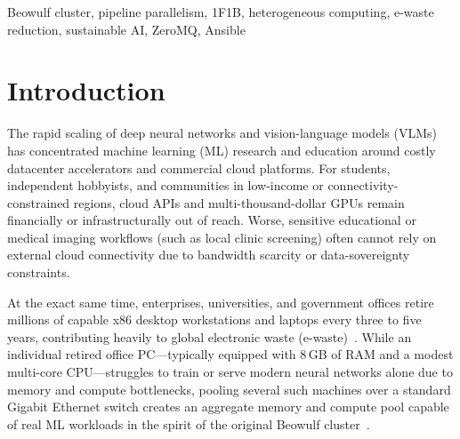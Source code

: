 \documentclass[conference]{IEEEtran}
\begin{document}
\begin{IEEEkeywords}
Beowulf cluster, pipeline parallelism, 1F1B, heterogeneous computing, e-waste reduction, sustainable AI, ZeroMQ, Ansible
\end{IEEEkeywords}

\section{Introduction}
The rapid scaling of deep neural networks and vision-language models (VLMs) has concentrated machine learning (ML) research and education around costly datacenter accelerators and commercial cloud platforms. For students, independent hobbyists, and communities in low-income or connectivity-constrained regions, cloud APIs and multi-thousand-dollar GPUs remain financially or infrastructurally out of reach. Worse, sensitive educational or medical imaging workflows (such as local clinic screening) often cannot rely on external cloud connectivity due to bandwidth scarcity or data-sovereignty constraints.

At the exact same time, enterprises, universities, and government offices retire millions of capable x86 desktop workstations and laptops every three to five years, contributing heavily to global electronic waste (e-waste)~\cite{sustainable_ai2022}. While an individual retired office PC---typically equipped with 8\,GB of RAM and a modest multi-core CPU---struggles to train or serve modern neural networks alone due to memory and compute bottlenecks, pooling several such machines over a standard Gigabit Ethernet switch creates an aggregate memory and compute pool capable of real ML workloads in the spirit of the original Beowulf cluster~\cite{beowulf1995}.
\end{document}
